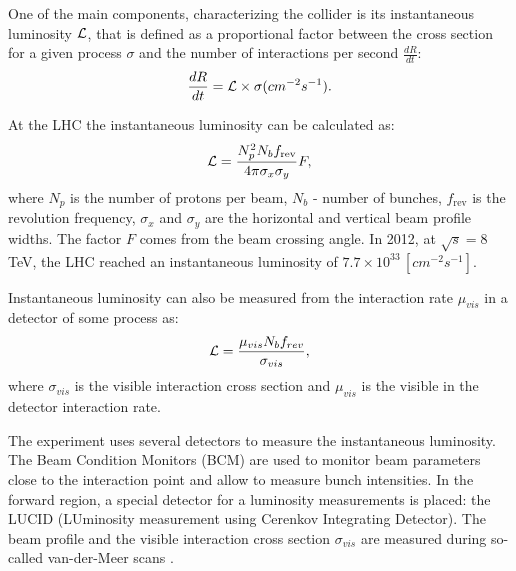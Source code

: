 One of the main components, characterizing the collider is its instantaneous luminosity $\mathcal{L}$, that is defined as a proportional factor between the cross section for a given process $\sigma$ and the number of interactions per second $\frac{dR}{dt}$:
\begin{equation}
\frac{dR}{dt}= \mathcal{L} \times \sigma (cm^{-2}s^{-1}).
\end{equation}

At the LHC the instantaneous luminosity can be calculated as:
\begin{equation}
\mathcal{L} = \frac{N_p^2 N_b f_{\textrm{rev}}}{4\pi  \sigma_x \sigma_y}F , 
\end{equation}
where $N_{p}$ is the number of protons per beam, $N_b$ - number of bunches, $f_{\textrm{rev}}$ is the revolution frequency, $\sigma_x$ and $\sigma_y$ are the horizontal and vertical beam profile widths. The factor $F$ comes from the beam crossing angle. In 2012, at $\sqrt{s}=$8 TeV, the LHC reached an instantaneous luminosity of $7.7\times10^{33}\, [cm^{-2}s^{-1}]$. 

Instantaneous luminosity can also be measured from the interaction rate $\mu_{vis}$ in a detector of some process as:
\begin{equation}
\mathcal{L} = \frac{\mu_{vis}N_b f_{rev}}{\sigma_{vis}},
\end{equation}
where $\sigma_{vis}$ is the visible interaction cross section and $\mu_{vis}$ is the visible in the detector interaction rate.

The \atlas experiment uses several detectors to measure the instantaneous luminosity. The Beam Condition Monitors (BCM) are used to monitor beam parameters close to the interaction point and allow to measure bunch intensities. In the forward region, a special detector for a luminosity measurements is placed: the LUCID (LUminosity measurement using Cerenkov Integrating Detector). The beam profile and the visible interaction cross section $\sigma_{vis}$ are measured during so-called van-der-Meer scans \cite{vanderMeer}. 
